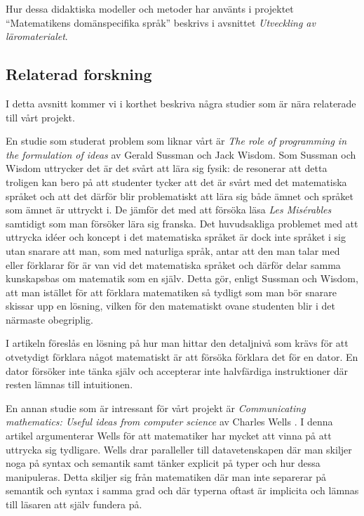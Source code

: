 \documentclass[12pt,a4paper,twoside,openright]{article}
\begin{document}
Hur dessa didaktiska modeller och metoder har använts i projektet
``Matematikens domänspecifika språk'' beskrivs i avsnittet
\textit{Utveckling av läromaterialet}.

\subsection{Relaterad forskning}
\label{sec:relForsk}
I detta avsnitt kommer vi i korthet beskriva några studier som
är nära relaterade till vårt projekt.

En studie som studerat problem som liknar vårt är \textit{The role of
programming in the formulation of ideas} \cite{sussman2002role} av
Gerald Sussman och Jack Wisdom.
Som Sussman och Wisdom uttrycker det är det svårt att lära sig fysik:
de resonerar att detta troligen kan bero på
att studenter tycker att det är svårt med det matematiska språket och
att det därför blir problematiskt att lära sig både ämnet och språket
som ämnet är uttryckt i. De jämför det med att försöka läsa
\textit{Les Misérables} samtidigt som man försöker lära sig
franska. Det huvudsakliga problemet med att uttrycka idéer och koncept
i det matematiska språket är dock inte språket i sig utan snarare att
man, som med naturliga språk, antar att den man talar med eller
förklarar för är van vid det matematiska språket och därför delar
samma kunskapsbas om matematik som en själv. Detta gör, enligt Sussman
och Wisdom, att man istället för att förklara
matematiken så tydligt som man bör snarare skissar upp en lösning,
vilken för den matematiskt ovane studenten blir i det närmaste
obegriplig.

I artikeln föreslås en lösning på hur man hittar den
detaljnivå som krävs för att otvetydigt förklara något matematiskt är
att försöka förklara det för en dator. En dator försöker inte tänka
själv och accepterar inte halvfärdiga instruktioner där resten lämnas
till intuitionen.

En annan studie som är intressant för vårt projekt är
\textit{Communicating mathematics: Useful ideas from computer science}
av Charles Wells \cite{wells1995communicating}. I denna artikel
argumenterar Wells för att matematiker har mycket att vinna på att
uttrycka sig tydligare. Wells
drar paralleller till datavetenskapen där man skiljer noga på syntax
och semantik samt tänker explicit på typer och hur dessa
manipuleras. Detta skiljer sig från matematiken där man inte separerar
på semantik och syntax i samma grad och där typerna oftast är
implicita och lämnas till läsaren att själv fundera på.
\end{document}
